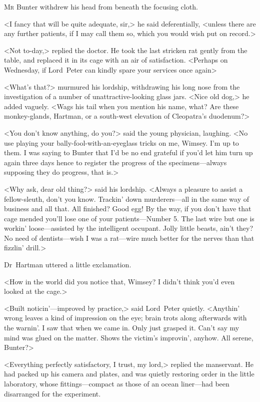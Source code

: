
\lettrine{M}{r} Bunter withdrew his head from beneath the focusing cloth.

\zz
<I fancy that will be quite adequate, sir,> he said deferentially, <unless there are any further patients, if I may call them so, which you would wish put on record.>

<Not to-day,> replied the doctor. He took the last stricken rat gently from the table, and replaced it in its cage with an air of satisfaction. <Perhaps on Wednesday, if Lord~Peter can kindly spare your services once again\longdash>

<What's that?> murmured his lordship, withdrawing his long nose from the investigation of a number of unattractive-looking glass jars. <Nice old dog,> he added vaguely. <Wags his tail when you mention his name, what? Are these monkey-glands, Hartman, or a south-west elevation of Cleopatra's duodenum?>

<You don't know anything, do you?> said the young physician, laughing. <No use playing your bally-fool-with-an-eyeglass tricks on me, Wimsey. I'm up to them. I was saying to Bunter that I'd be no end grateful if you'd let him turn up again three days hence to register the progress of the specimens—always supposing they do progress, that is.>

<Why ask, dear old thing?> said his lordship. <Always a pleasure to assist a fellow-sleuth, don't you know. Trackin' down murderers—all in the same way of business and all that. All finished? Good egg! By the way, if you don't have that cage mended you'll lose one of your patients—Number 5. The last wire but one is workin' loose—assisted by the intelligent occupant. Jolly little beasts, ain't they? No need of dentists—wish I was a rat—wire much better for the nerves than that fizzlin' drill.>

Dr~Hartman uttered a little exclamation.

<How in the world did you notice that, Wimsey? I didn't think you'd even looked at the cage.>

<Built noticin'—improved by practice,> said Lord~Peter quietly. <Anythin' wrong leaves a kind of impression on the eye; brain trots along afterwards with the warnin'. I saw that when we came in. Only just grasped it. Can't say my mind was glued on the matter. Shows the victim's improvin', anyhow. All serene, Bunter?>

<Everything perfectly satisfactory, I trust, my lord,> replied the manservant. He had packed up his camera and plates, and was quietly restoring order in the little laboratory, whose fittings—compact as those of an ocean liner—had been disarranged for the experiment.


